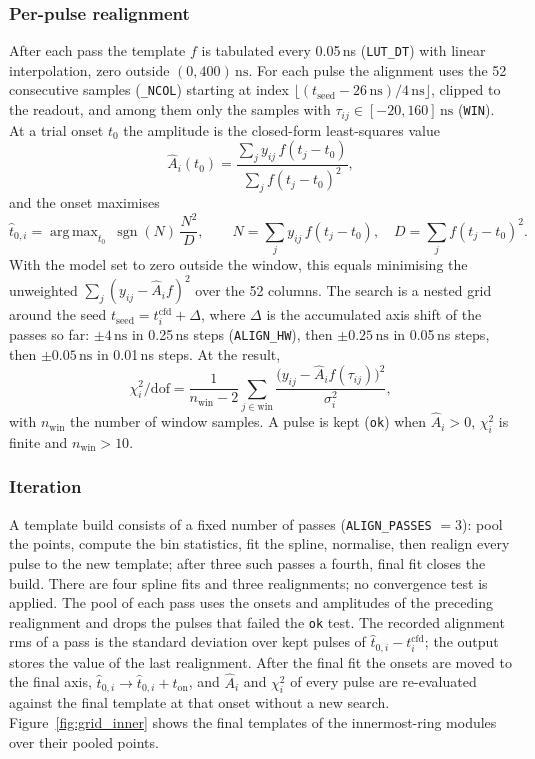 \documentclass[11pt]{article}
\newcommand{\ns}{\,\mathrm{ns}}
\newcommand{\code}[1]{\texttt{#1}}
\DeclareMathOperator*{\argmax}{arg\,max}
\DeclareMathOperator{\sgn}{sgn}
\begin{document}
\subsubsection{Per-pulse realignment}
\label{sec:align}

After each pass the template $f$ is tabulated every 0.05\,ns (\code{LUT\_DT}) with linear interpolation, zero outside $(0, 400)\ns$. For each pulse the alignment uses the 52 consecutive samples (\code{\_NCOL}) starting at index $\lfloor (t_{\mathrm{seed}} - 26\ns)/4\ns \rfloor$, clipped to the readout, and among them only the samples with $\tau_{ij} \in [-20, 160]\ns$ (\code{WIN}). At a trial onset $t_0$ the amplitude is the closed-form least-squares value
\begin{equation}
\hat A_i(t_0) = \frac{\sum_j y_{ij}\, f(t_j - t_0)}{\sum_j f(t_j - t_0)^2},
\end{equation}
and the onset maximises
\begin{equation}
\hat t_{0,i} = \argmax_{t_0}\ \sgn(N)\, \frac{N^2}{D},
\qquad N = \sum_j y_{ij}\, f(t_j - t_0),\quad D = \sum_j f(t_j - t_0)^2 .
\label{eq:t0}
\end{equation}
With the model set to zero outside the window, this equals minimising the unweighted $\sum_j (y_{ij} - \hat A_i f)^2$ over the 52 columns. The search is a nested grid around the seed $t_{\mathrm{seed}} = t^{\mathrm{cfd}}_i + \Delta$, where $\Delta$ is the accumulated axis shift of the passes so far: $\pm 4\ns$ in 0.25\,ns steps (\code{ALIGN\_HW}), then $\pm 0.25\ns$ in 0.05\,ns steps, then $\pm 0.05\ns$ in 0.01\,ns steps. At the result,
\begin{equation}
\chi^2_i/\mathrm{dof} = \frac{1}{n_{\mathrm{win}} - 2} \sum_{j \in \mathrm{win}} \frac{\big(y_{ij} - \hat A_i f(\tau_{ij})\big)^2}{\sigma_i^2},
\label{eq:chi2}
\end{equation}
with $n_{\mathrm{win}}$ the number of window samples. A pulse is kept (\code{ok}) when $\hat A_i > 0$, $\chi^2_i$ is finite and $n_{\mathrm{win}} > 10$.

\subsubsection{Iteration}

A template build consists of a fixed number of passes (\code{ALIGN\_PASSES} $= 3$): pool the points, compute the bin statistics, fit the spline, normalise, then realign every pulse to the new template; after three such passes a fourth, final fit closes the build. There are four spline fits and three realignments; no convergence test is applied. The pool of each pass uses the onsets and amplitudes of the preceding realignment and drops the pulses that failed the \code{ok} test. The recorded alignment rms of a pass is the standard deviation over kept pulses of $\hat t_{0,i} - t^{\mathrm{cfd}}_i$; the output stores the value of the last realignment. After the final fit the onsets are moved to the final axis, $\hat t_{0,i} \to \hat t_{0,i} + t_{\mathrm{on}}$, and $\hat A_i$ and $\chi^2_i$ of every pulse are re-evaluated against the final template at that onset without a new search. Figure~\ref{fig:grid_inner} shows the final templates of the innermost-ring modules over their pooled points.
\end{document}
